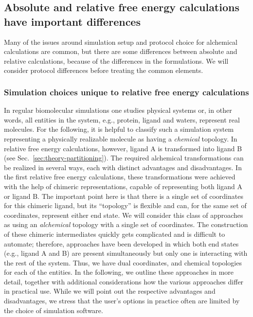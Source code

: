 \documentclass[9pt,bestpractices]{livecoms}
\begin{document}
\subsection{Absolute and relative free energy calculations have important differences}

Many of the issues around simulation setup and protocol choice for
alchemical calculations are common, but there are some differences
between absolute and relative calculations, because of the differences
in the formulations. We will consider protocol differences before
treating the common elements.

\subsubsection{Simulation choices unique to relative free energy calculations}
\label{sec:relative-fe-protocol}

In regular biomolecular simulations one studies physical systems or, in other words, all entities in the system, e.g., protein, ligand and waters, represent real molecules. For the following, it is helpful to classify such a simulation system representing a physically realizable molecule as having a {\em chemical} topology. In relative free energy calculations, however, ligand A is transformed into ligand B (see Sec.~\ref{sec:theory-partitioning}). The required alchemical transformations can be realized in several ways, each with distinct advantages and disadvantages. In the first relative free energy calculations, these transformations were achieved with the help of chimeric representations, capable of representing both ligand A or ligand B. The important point here is that there is a single set of coordinates for this chimeric ligand, but its ``topology'' is flexible and can, for the same set of coordinates, represent either end state. We will consider this class of approaches as using an {\em alchemical} topology with a single set of coordinates. The construction of these chimeric intermediates quickly gets complicated and is difficult to automate; therefore, approaches have been developed in which both end states (e.g., ligand A and B) are present simultaneously  but only one is interacting with the rest of the system. Thus, we have dual coordinates, and chemical topologies for each of the entities. In the following, we outline these approaches in more detail, together with additional considerations how the various approaches differ in practical use. While we will point out the respective advantages and disadvantages, we stress that the user's options in practice often are limited by the choice of simulation software.
\end{document}
